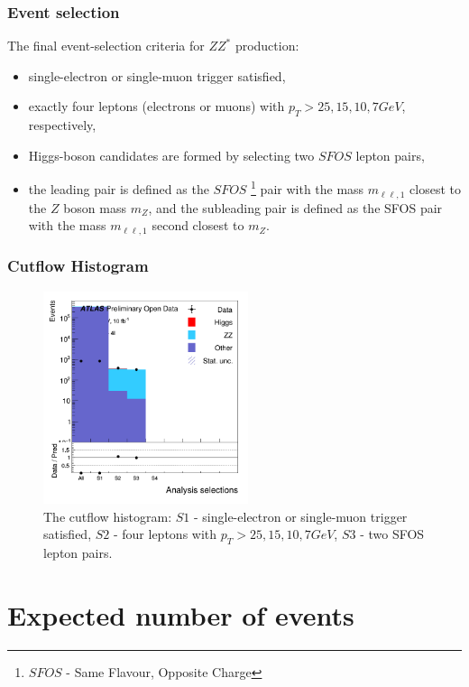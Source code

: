 \documentclass[aspectratio=1610, english]{beamer}
\begin{document}
\begin{frame}
\frametitle{Event selection}
The final event-selection criteria for $ZZ^*$ production:

\begin{itemize}
\item single-electron or single-muon trigger satisfied,
\item exactly four leptons (electrons or muons) with $p_T>25, 15, 10, 7 GeV$, respectively,
\item Higgs-boson candidates are formed by selecting two $SFOS$ lepton pairs,
\item the leading pair is defined as the $SFOS$ \footnote{$SFOS$ - Same Flavour, Opposite Charge} pair with the mass $m_{\ell \ell, 1}$ closest to the $Z$ boson mass $m_Z$, and the subleading pair is defined as the SFOS pair with the mass $m_{\ell \ell, 1}$ second closest to $m_Z$. \cite{opendata}

\end{itemize}

\end{frame}

\begin{frame}
\frametitle{Cutflow Histogram}

\begin{figure} [H]
\centering
\includegraphics[width=6cm]{hist_cutflow.png}
\caption{The cutflow histogram: $S1$ - single-electron or single-muon trigger satisfied, $S2$ - four leptons with $p_T>25, 15, 10, 7 GeV$, $S3$ - two SFOS lepton pairs. }
\end{figure}

\end{frame}

\section{Expected number of events}
\end{document}
